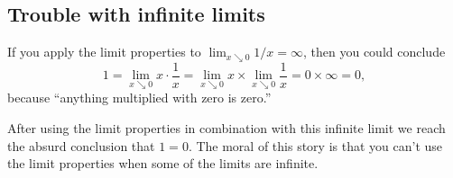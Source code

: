 \subsection{Trouble with infinite limits} 
\label{sec:trouble-with-infinite-limits}
If you apply the limit properties to $\lim_{x\searrow0} 1/x = \infty$,
then you could conclude
\[
1 = \lim_{x\searrow 0} x\cdot \frac{1} {x}
 = \lim_{x\searrow 0} x \times \lim_{x\searrow 0}  \frac{1} {x}
 = 0 \times \infty
 = 0,
\]
because ``anything multiplied with zero is zero.''

After using the limit properties in combination with this infinite
limit we reach the absurd conclusion that $1=0$.  The moral of this
story is that you can't use the limit properties when some of the
limits are infinite.

